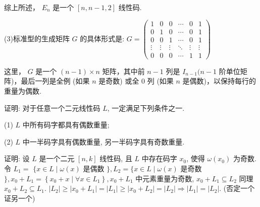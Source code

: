 \begin{tcolorbox}[breakable,colback=blue!5!white,colframe=blue!75!black,
 title= 解答题]
综上所述， $ E_{n} $ 是一个 $ [n, n-1,2] $ 线性码.

(3)标准型的生成矩阵 $ G $ 的具体形式是:
$
G=\left(\begin{array}{cccccc}
1 & 0 & 0 & \cdots & 0 & 1 \\
0 & 1 & 0 & \cdots & 0 & 1 \\
0 & 0 & 1 & \cdots & 0 & 1 \\
\vdots & \vdots & \vdots & \ddots & \vdots & \vdots \\
0 & 0 & 0 & \cdots & 1 & 1
\end{array}\right)
$

这里， $ G $ 是一个 $ (n-1) \times n $ 矩阵，其中前 $ n-1 $ 列是 $ I_{n-1}(n-1 $ 阶单位矩阵)，最后一列是全例 (如果 $ n $ 是奇数) 或全 0 列 (如果 $ n $ 是偶数)，以保持每行的重量为偶数.
 
 \end{tcolorbox}





  \begin{tcolorbox}[breakable,colback=blue!5!white,colframe=blue!75!black,
 title= 解答题]

 证明: 对于任意一个二元线性码 $ L $, 一定满足下列条件之一.
 
(1) $L$ 中所有码字都具有偶数重量;

(2) $ L $ 中一半码字具有偶数重量, 另一半码字具有奇数重量.
\tcblower


证明: 设 $ L $ 是一个二元 $ [n, k] $ 线性码, 且 $ L $ 中存在码字 $ x_{0} $, 使得 $ \omega\left(x_{0}\right) $ 为奇数. 令 $ L_{1}= $ $ \{x \in L \mid \omega(x) $ 是偶数 $ \}, L_{2}=\{x \in L \mid \omega(x) $ 是奇数 $ \}, x_{0}+L_{1}=\left\{x_{0}+x \mid \forall x \in L_{1}\right\}, x_{0}+L_{1} $ 中元素重量为奇数, $ x_{0}+L_{1} \subseteq L_{2} $ 同理 $ x_{0}+L_{2} \subseteq L_{1} $.
$
\left|L_{2}\right| \geq\left|x_{0}+L_{1}\right|=\left|L_{1}\right| \geq\left|x_{0}+L_{2}\right|=\left|L_{2}\right| \Rightarrow\left|L_{1}\right|=\left|L_{2}\right| .
$
(否定一个证另一个)
 \end{tcolorbox}

